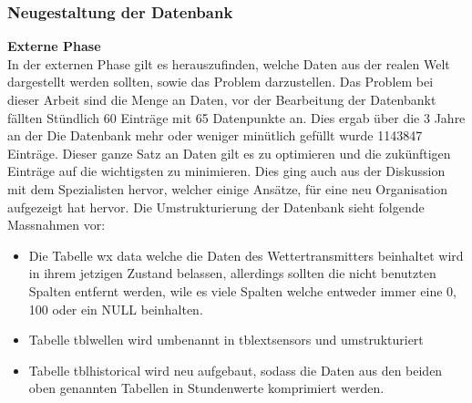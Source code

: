 \subsubsection{Neugestaltung der Datenbank}
\textbf{Externe Phase}\\
In der externen Phase gilt es herauszufinden, welche Daten aus der realen Welt dargestellt werden sollten, sowie das Problem darzustellen. Das Problem bei dieser Arbeit sind die Menge an Daten, vor der Bearbeitung der Datenbankt fällten Stündlich 60 Einträge mit 65 Datenpunkte an. Dies ergab über die 3 Jahre an der Die Datenbank mehr oder weniger minütlich gefüllt wurde 1143847 Einträge. Dieser ganze Satz an Daten gilt es zu optimieren und die zukünftigen Einträge auf die wichtigsten zu minimieren. Dies ging auch aus der Diskussion mit dem Spezialisten hervor, welcher einige Ansätze, für eine neu Organisation aufgezeigt hat hervor. Die Umstrukturierung der Datenbank sieht folgende Massnahmen vor:
\begin{itemize}
\item Die Tabelle wx data welche die Daten des Wettertransmitters beinhaltet wird in ihrem jetzigen Zustand belassen, allerdings sollten die nicht benutzten Spalten entfernt werden, wile es viele Spalten welche entweder immer eine 0, 100 oder ein NULL beinhalten.
\item Tabelle tblwellen wird umbenannt in tblextsensors und umstrukturiert
\item Tabelle tblhistorical wird neu aufgebaut, sodass die Daten aus den beiden oben genannten Tabellen in Stundenwerte komprimiert werden. 
\end{itemize}

